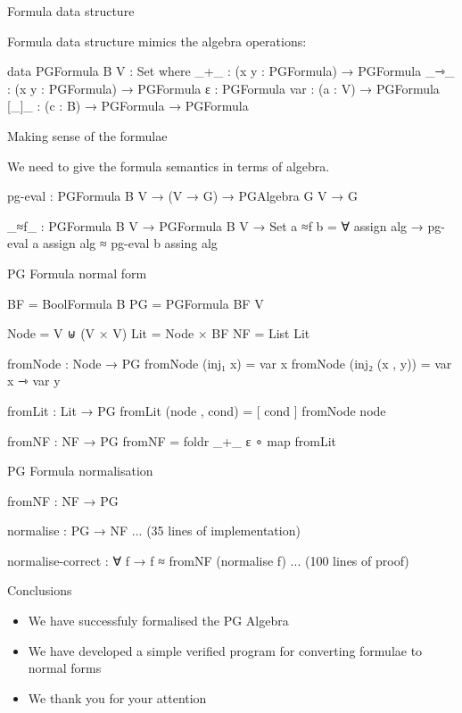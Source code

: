 \documentclass[12pt]{beamer}
\newcommand{\D}[1]{\blue{\mathsf{#1}}}
\newcommand{\hyp}{\text{-}}
\begin{document}




\begin{frame}{Formula data structure}

Formula data structure mimics the algebra operations:

\begin{code}
 data PGFormula B V : Set where
  _+_ : (x y : PGFormula) → PGFormula
  _⇾_ : (x y : PGFormula) → PGFormula
  ε : PGFormula
  var : (a : V) → PGFormula
  [_]_ : (c : B) → PGFormula → PGFormula
\end{code}
\end{frame}

\begin{frame}{Making sense of the formulae}

We need to give the formula semantics in terms of algebra.

\begin{code}
pg-eval : PGFormula B V
    → (V → G) 
    → PGAlgebra G V
    → G
\end{code}
\begin{code}
_≈f_ : PGFormula B V → PGFormula B V → Set
a ≈f b = ∀ assign alg 
         → pg-eval a assign alg ≈ pg-eval b assing alg
\end{code}

\end{frame}

\begin{frame}{PG Formula normal form}

\begin{code}
BF = BoolFormula B
PG = PGFormula BF V

Node = V ⊎ (V × V)
Lit = Node × BF
NF = List Lit
\end{code}

\begin{code}
fromNode : Node → PG
fromNode (inj₁ x) = var x
fromNode (inj₂ (x , y)) = var x ⇾ var y

fromLit : Lit → PG
fromLit (node , cond) = [ cond ] fromNode node

fromNF : NF → PG
fromNF = foldr _+_ ε ∘ map fromLit
\end{code}

\end{frame}

\begin{frame}{PG Formula normalisation}

\begin{code}
  fromNF : NF → PG

  normalise : PG → NF
  ... (35 lines of implementation)

  normalise-correct : ∀ f → f ≈ fromNF (normalise f)
  ... (100 lines of proof)
\end{code}
\end{frame}

\begin{frame}{Conclusions}

\begin{itemize}
\item We have successfuly formalised the PG Algebra
\item We have developed a simple verified program for converting formulae to normal forms
\item We thank you for your attention
\end{itemize}

\end{frame}
\end{document}
